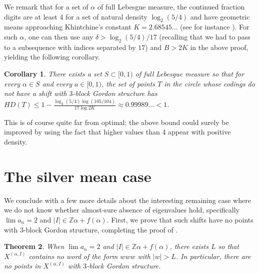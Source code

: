 \documentclass[11pt,reqno]{amsart}
\newtheorem{theorem}{Theorem}[section]
\newtheorem{corollary}[theorem]{Corollary}
\theoremstyle{definition}
\theoremstyle{plain}
\begin{document}
We remark that for a set of $\alpha$ of full Lebesgue measure, the continued fraction digits are at least $4$ for a set of natural density $\log_2(5/4)$ and have geometric means approaching Khintchine's constant 
$K = 2.68545\ldots$ (see for instance \cite{khinchin}). For such $\alpha$, one can then use any $\delta > \log_2(5/4)/17$ (recalling that we had to pass to a subsequence with indices separated by $17$) and 
$B > 2K$ in the above proof, yielding the following corollary.

\begin{corollary}\label{HDcor}
There exists a set $S \subset [0,1)$ of full Lebesgue measure so that for every $\alpha \in S$ and every $a \in [0,1)$, the set of points $T$ in the circle whose codings do not have a shift with $3$-block Gordon structure has 
$HD(T) \leq 1 - \frac{\log_2(5/4) \log(105/104)}{17\log 2K} \approx 0.99989 \ldots < 1$.
\end{corollary}


This is of course quite far from optimal; the above bound could surely be improved by using the fact that higher values than $4$ appear with positive density.




\section{The silver mean case}\label{silver}

We conclude with a few more details about the interesting remaining case where we do not know whether almost-sure absence of eigenvalues hold, specifically $\lim a_n = 2$ and $|I| \in \mathbb{Z}\alpha + f(\alpha)$. First, we prove that such shifts have no points with $3$-block Gordon structure, completing the proof of .

\begin{theorem}\label{badcase}
When $\lim a_n = 2$ and $|I| \in \mathbb{Z}\alpha + f(\alpha)$, there exists $L$ so that $X^{(\alpha,I)}$ contains no word of the form $www$ with $|w| > L$. In particular, there are no points in $X^{(\alpha,I)}$ with $3$-block Gordon structure. 
\end{theorem}
\end{document}
